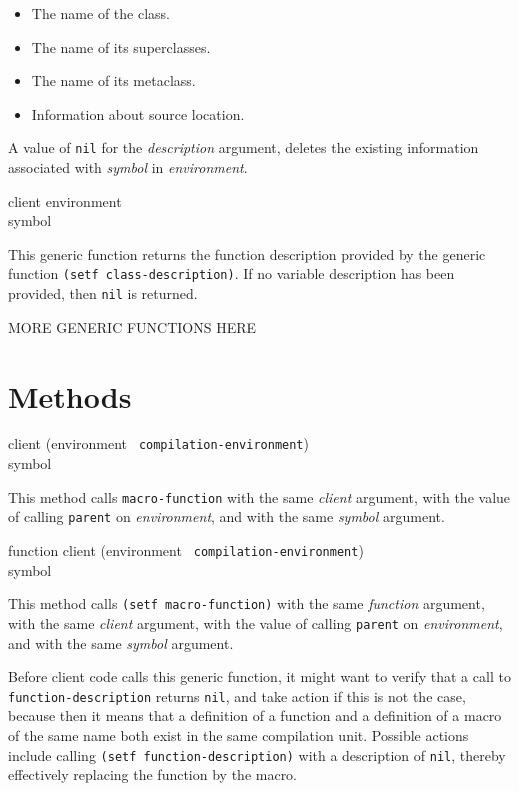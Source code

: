\begin{itemize}
\item The name of the class.
\item The name of its superclasses.
\item The name of its metaclass.
\item Information about source location.
\end{itemize}

A value of \texttt{nil} for the \textit{description} argument, deletes
the existing information associated with \textit{symbol} in
\textit{environment}.

 {client environment \\ symbol}

This generic function returns the function description provided by the
generic function \texttt{(setf class-description)}.  If no variable
description has been provided, then \texttt{nil} is returned.

MORE GENERIC FUNCTIONS HERE

\section{Methods}

{\small{} {client (environment {\tt
      compilation-environment}) \\ symbol}
}

This method calls \texttt{macro-function} with the same
\textit{client} argument, with the value of calling \texttt{parent} on
\textit{environment}, and with the same \textit{symbol} argument.

{\small{} {function client (environment {\tt
      compilation-environment}) \\ symbol}
}

This method calls \texttt{(setf macro-function)} with the same
\textit{function} argument, with the same \textit{client} argument, with
the value of calling \texttt{parent} on \textit{environment}, and with
the same \textit{symbol} argument.

Before client code calls this generic function, it might want to
verify that a call to \texttt{function-description} returns
\texttt{nil}, and take action if this is not the case, because then it
means that a definition of a function and a definition of a macro of
the same name both exist in the same compilation unit.  Possible
actions include calling \texttt{(setf function-description)} with a
description of \texttt{nil}, thereby effectively replacing the
function by the macro.

